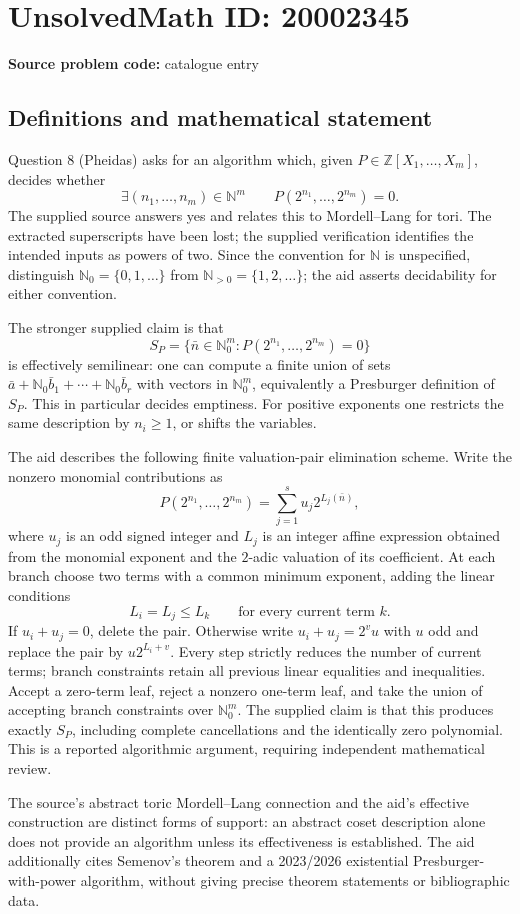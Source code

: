 \documentclass[11pt]{article}
\newcommand{\N}{\mathbb{N}}
\newcommand{\Z}{\mathbb{Z}}
\begin{document}
\section*{UnsolvedMath ID: 20002345}
\textbf{Source problem code:} catalogue entry
\subsection{Definitions and mathematical statement}
Question 8 (Pheidas) asks for an algorithm which, given $P\in\Z[X_1,\ldots,X_m]$, decides whether
\[
\exists(n_1,\ldots,n_m)\in\N^m\qquad P(2^{n_1},\ldots,2^{n_m})=0.
\]
The supplied source answers yes and relates this to Mordell--Lang for tori. The extracted superscripts have been lost; the supplied verification identifies the intended inputs as powers of two. Since the convention for $\N$ is unspecified, distinguish $\N_0=\{0,1,\ldots\}$ from $\N_{>0}=\{1,2,\ldots\}$; the aid asserts decidability for either convention.

The stronger supplied claim is that
\[
S_P=\{\bar n\in\N_0^m:P(2^{n_1},\ldots,2^{n_m})=0\}
\]
is effectively semilinear: one can compute a finite union of sets $\bar a+\N_0\bar b_1+\cdots+\N_0\bar b_r$ with vectors in $\N_0^m$, equivalently a Presburger definition of $S_P$. This in particular decides emptiness. For positive exponents one restricts the same description by $n_i\geq1$, or shifts the variables.

The aid describes the following finite valuation-pair elimination scheme. Write the nonzero monomial contributions as
\[
P(2^{n_1},\ldots,2^{n_m})=\sum_{j=1}^s u_j2^{L_j(\bar n)},
\]
where $u_j$ is an odd signed integer and $L_j$ is an integer affine expression obtained from the monomial exponent and the $2$-adic valuation of its coefficient. At each branch choose two terms with a common minimum exponent, adding the linear conditions
\[
L_i=L_j\leq L_k\qquad\text{for every current term }k.
\]
If $u_i+u_j=0$, delete the pair. Otherwise write $u_i+u_j=2^v u$ with $u$ odd and replace the pair by $u2^{L_i+v}$. Every step strictly reduces the number of current terms; branch constraints retain all previous linear equalities and inequalities. Accept a zero-term leaf, reject a nonzero one-term leaf, and take the union of accepting branch constraints over $\N_0^m$. The supplied claim is that this produces exactly $S_P$, including complete cancellations and the identically zero polynomial. This is a reported algorithmic argument, requiring independent mathematical review.

The source's abstract toric Mordell--Lang connection and the aid's effective construction are distinct forms of support: an abstract coset description alone does not provide an algorithm unless its effectiveness is established. The aid additionally cites Semenov's theorem and a 2023/2026 existential Presburger-with-power algorithm, without giving precise theorem statements or bibliographic data.
\end{document}
